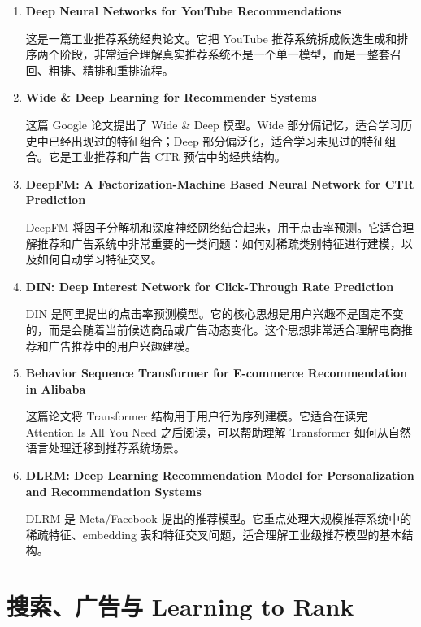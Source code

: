 \begin{enumerate}
    \item \textbf{Deep Neural Networks for YouTube Recommendations}

    这是一篇工业推荐系统经典论文。它把 YouTube 推荐系统拆成候选生成和排序两个阶段，非常适合理解真实推荐系统不是一个单一模型，而是一整套召回、粗排、精排和重排流程。

    \item \textbf{Wide \& Deep Learning for Recommender Systems}

    这篇 Google 论文提出了 Wide \& Deep 模型。Wide 部分偏记忆，适合学习历史中已经出现过的特征组合；Deep 部分偏泛化，适合学习未见过的特征组合。它是工业推荐和广告 CTR 预估中的经典结构。

    \item \textbf{DeepFM: A Factorization-Machine Based Neural Network for CTR Prediction}

    DeepFM 将因子分解机和深度神经网络结合起来，用于点击率预测。它适合理解推荐和广告系统中非常重要的一类问题：如何对稀疏类别特征进行建模，以及如何自动学习特征交叉。

    \item \textbf{DIN: Deep Interest Network for Click-Through Rate Prediction}

    DIN 是阿里提出的点击率预测模型。它的核心思想是用户兴趣不是固定不变的，而是会随着当前候选商品或广告动态变化。这个思想非常适合理解电商推荐和广告推荐中的用户兴趣建模。

    \item \textbf{Behavior Sequence Transformer for E-commerce Recommendation in Alibaba}

    这篇论文将 Transformer 结构用于用户行为序列建模。它适合在读完 Attention Is All You Need 之后阅读，可以帮助理解 Transformer 如何从自然语言处理迁移到推荐系统场景。

    \item \textbf{DLRM: Deep Learning Recommendation Model for Personalization and Recommendation Systems}

    DLRM 是 Meta/Facebook 提出的推荐模型。它重点处理大规模推荐系统中的稀疏特征、embedding 表和特征交叉问题，适合理解工业级推荐模型的基本结构。
\end{enumerate}

\section{搜索、广告与 Learning to Rank}

